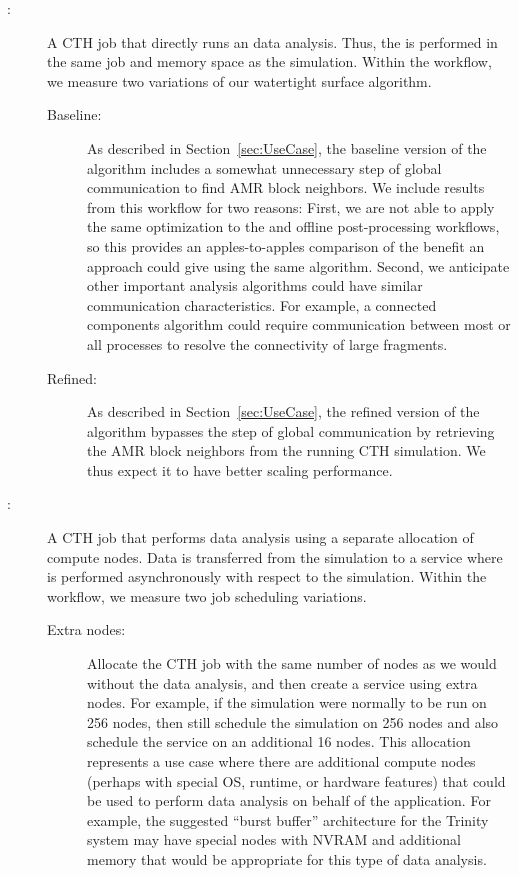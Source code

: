 \begin{description}

\item[\Insitu:] A CTH job that directly runs an \insitu data analysis.  Thus,
  the \vda is performed in the same job and memory space as the
  simulation.  Within the \insitu workflow, we measure two variations of
  our watertight surface algorithm.

  \begin{description}

  \item[Baseline:] As described in Section~\ref{sec:UseCase}, the baseline
    version of the algorithm includes a somewhat unnecessary step of global
    communication to find AMR block neighbors.  We include results from
    this workflow for two reasons: First, we are not able to apply the same
    optimization to the \intransit and offline post-processing workflows,
    so this provides an apples-to-apples comparison of the benefit an
    \intransit approach could give using the same algorithm.  Second, we
    anticipate other important analysis algorithms could have similar
    communication characteristics.  For example, a connected components
    algorithm could require communication between most or all processes to
    resolve the connectivity of large fragments.

  \item[Refined:] As described in Section~\ref{sec:UseCase}, the refined
    version of the algorithm bypasses the step of global communication by
    retrieving the AMR block neighbors from the running CTH simulation.  We
    thus expect it to have better scaling performance.

  \end{description}

\item[\Intransit:] A CTH job that performs \intransit data analysis using a
  separate allocation of compute nodes.  Data is transferred from the
  simulation to a service where \vda is performed asynchronously with
  respect to the simulation.  Within the \intransit workflow, we measure
  two job scheduling variations.

  \begin{description}

  \item[Extra nodes:] Allocate the CTH job with the same number of nodes as
    we would without the data analysis, and then create a \vda service using
    extra nodes.  For example, if the simulation were normally to be run on
    256 nodes, then still schedule the simulation on 256 nodes and also
    schedule the \vda service on an additional 16 nodes.  This allocation
    represents a use case where there are additional compute nodes (perhaps
    with special OS, runtime, or hardware features) that could be used to
    perform data analysis on behalf of the application.  For example, the
    suggested ``burst buffer'' architecture for the Trinity system may have
    special nodes with NVRAM and additional memory that would be
    appropriate for this type of \intransit data analysis.


\end{description}
\end{description}
